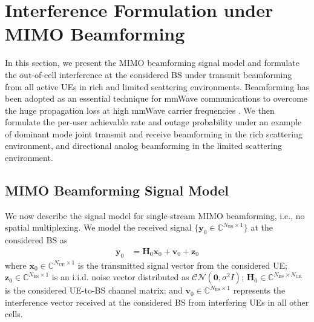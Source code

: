 \documentclass[12pt, draftclsnofoot, onecolumn]{IEEEtran}
\theoremstyle{plain}
\begin{document}
% 
\vspace{-.1in} 
\section{Interference Formulation under MIMO Beamforming}\label{RelayScheme}\vspace{-.1in}
In this section, we present the MIMO beamforming signal model and formulate the out-of-cell interference at the considered BS under transmit beamforming from all active UEs in rich and limited scattering environments. Beamforming has been adopted as an essential technique for mmWave communications to overcome the huge propagation loss at high mmWave carrier frequencies \cite{mmWaveEnable,mmWaveSurvey15}.  We then formulate the per-user achievable rate and outage probability under an example of dominant mode joint transmit and receive beamforming in the rich scattering environment, and directional analog beamforming in the limited scattering environment.
%
\vspace{-.1in}
\subsection{MIMO Beamforming Signal Model}\label{original model}\vspace{-.1in}
We now describe the signal model for {single-stream MIMO beamforming}, i.e., no spatial multiplexing.
We model the received signal $\{
\textbf{y}_{0} \in \mathbb{C}^{N_{\text{BS}}\times 1}\}$ at the considered {BS} as \vspace{-.1in}
\begin{align}\label{Eq_4r1}
\textbf{y}_{0} &= \textbf{H}_{0} \textbf{x}_{0} +\textbf{v}_{0}+\textbf{z}_{0}
\end{align}
where $\textbf{x}_{0} \in \mathbb{C}^{N_{\text{UE}}\times 1}$ is the transmitted signal vector from the considered UE; $\textbf{z}_{0} \in \mathbb{C}^{N_{\text{BS}}\times 1}$ is an i.i.d.  noise vector distributed as $ \mathcal{CN}(\textbf{0},\sigma^2 I) $; $\textbf{H}_{0}\in \mathbb{C}^{N_{\text{BS}}\times N_{\text{UE}}}$ is the considered UE-to-BS channel matrix; and $\textbf{v}_{0} \in \mathbb{C}^{N_{\text{BS}}\times 1}$ represents the interference vector received at the considered BS from interfering UEs in all other cells.
 
\end{document}
